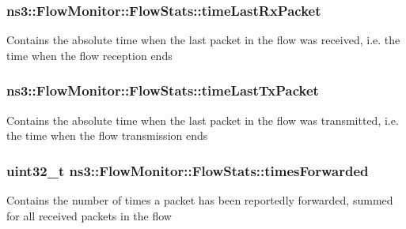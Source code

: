 \subsubsection[{\texorpdfstring{time\+Last\+Rx\+Packet}{timeLastRxPacket}}]{ ns3\+::\+Flow\+Monitor\+::\+Flow\+Stats\+::time\+Last\+Rx\+Packet}\hypertarget{structns3_1_1FlowMonitor_1_1FlowStats_a96fdd2ad422c4428fe058b905f4e11dd}{}\label{structns3_1_1FlowMonitor_1_1FlowStats_a96fdd2ad422c4428fe058b905f4e11dd}
Contains the absolute time when the last packet in the flow was received, i.\+e. the time when the flow reception ends 
\subsubsection[{\texorpdfstring{time\+Last\+Tx\+Packet}{timeLastTxPacket}}]{ ns3\+::\+Flow\+Monitor\+::\+Flow\+Stats\+::time\+Last\+Tx\+Packet}\hypertarget{structns3_1_1FlowMonitor_1_1FlowStats_a2f88b832899d8d486204e59da1b5db94}{}\label{structns3_1_1FlowMonitor_1_1FlowStats_a2f88b832899d8d486204e59da1b5db94}
Contains the absolute time when the last packet in the flow was transmitted, i.\+e. the time when the flow transmission ends 
\subsubsection[{\texorpdfstring{times\+Forwarded}{timesForwarded}}]{\setlength{\rightskip}{0pt plus 5cm}uint32\+\_\+t ns3\+::\+Flow\+Monitor\+::\+Flow\+Stats\+::times\+Forwarded}\hypertarget{structns3_1_1FlowMonitor_1_1FlowStats_ad03e7c7b253052032edb33f1ac66ee75}{}\label{structns3_1_1FlowMonitor_1_1FlowStats_ad03e7c7b253052032edb33f1ac66ee75}
Contains the number of times a packet has been reportedly forwarded, summed for all received packets in the flow 
